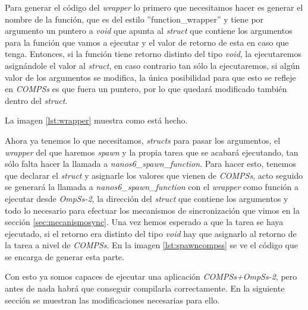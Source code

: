 Para generar el código del \textit{wrapper} lo primero que necesitamos hacer es generar el nombre de la función, que es del estilo ''function\_wrapper'' y tiene por argumento un puntero a \textit{void} que apunta al \textit{struct} que contiene los argumentos para la función que vamos a ejecutar y el valor de retorno de esta en caso que tenga. Entonces, si la función tiene retorno distinto del tipo \textit{void}, la ejecutaremos asignándole el valor al \textit{struct}, en caso contrario tan sólo la ejecutaremos, si algún valor de los argumentos se modifica, la única posibilidad para que esto se refleje en \textit{COMPSs} es que fuera un puntero, por lo que quedará modificado también dentro del \textit{struct}.

\begin{comment} 
se generará \textit{struct\_->ret =}, y a continuación se genera la llamada a la función y se efectúa el paso de argumentos en caso que los haya. Para acceder a los argumentos de la función desde el compilador, se utiliza el campo de la estructura \textit{function}: \textit{first\_argument}. Recorrerá los argumentos que están enlazados entre sí de forma semejante a una lista (tan solo que no está doblemente enlazada), hasta que llegue al final.
\end{comment}
\smallskip
La imagen \ref{lst:wrapper} muestra como está hecho.

\bigskip

Ahora ya tenemos lo que necesitamos, \textit{structs} para pasar los argumentos, el \textit{wrapper} del que haremos \textit{spawn} y la propia tarea que se acabará ejecutando, tan sólo falta hacer la llamada a \textit{nanos6\_spawn\_function}. Para hacer esto, tenemos que declarar el \textit{struct} y asignarle los valores que vienen de \textit{COMPSs}, acto seguido se generará la llamada a \textit{nanos6\_spawn\_function} con el \textit{wrapper} como función a ejecutar desde \textit{OmpSs-2}, la dirección del \textit{struct} que contiene los argumentos y todo lo necesario para efectuar los mecanismos de sincronización que vimos en la sección \ref{sec:mecanismosync}. Una vez hemos esperado a que la tarea se haya ejecutado, si el retorno era distinto del tipo \textit{void} hay que asignarlo al retorno de la tarea a nivel de \textit{COMPSs}. En la imagen \ref{lst:spawncompss} se ve el código que se encarga de generar esta parte.

Con esto ya somos capaces de ejecutar una aplicación \textit{COMPSs+OmpSs-2}, pero antes de nada habrá que conseguir compilarla correctamente. En la siguiente sección se muestran las modificaciones necesarias para ello.

